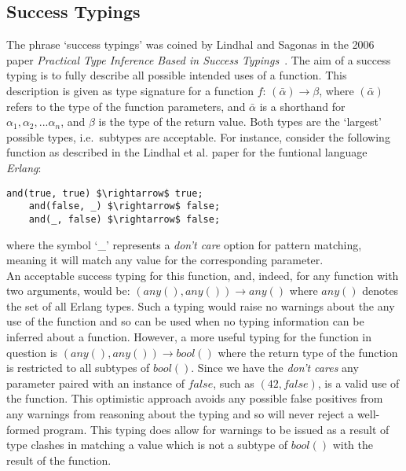 \documentclass[12pt, titlepage]{article}
\begin{document}


\subsection{Success Typings}
The phrase `success typings' was coined by Lindhal and Sagonas in the 2006 paper \textit{Practical Type Inference Based in Success Typings}~\cite{lindhal06}. The aim of a success typing is to fully describe all possible intended uses of a function. This description is given as type signature for a function $f$: $(\bar{\alpha}) \rightarrow \beta$, where $(\bar{\alpha})$ refers to the type of the function parameters, and $\bar{\alpha}$ is a shorthand for $\alpha_1, \alpha_2,...\alpha_n$, and $\beta$ is the type of the return value. Both types are the `largest' possible types, i.e.\ subtypes are acceptable. For instance, consider the following function as described in the Lindhal et al. paper for the funtional language \textit{Erlang}:
\begin{lstlisting}[mathescape]
	and(true, true) $\rightarrow$ true;
	and(false, _) $\rightarrow$ false;
	and(_, false) $\rightarrow$ false;
\end{lstlisting}
where the symbol `\_' represents a \textit{don't care} option for pattern matching, meaning it will match any value for the corresponding parameter. \\
An acceptable success typing for this function, and, indeed, for any function with two arguments, would be: $(any(), any()) \rightarrow any()$ where $any()$ denotes the set of all Erlang types. Such a typing would raise no warnings about the any use of the function and so can be used when no typing information can be inferred about a function. However, a more useful typing for the function in question is $(any(), any()) \rightarrow bool()$ where the return type of the function is restricted to all subtypes of $bool()$. Since we have the \textit{don't cares} any parameter paired with an instance of $false$, such as $(42, false)$, is a valid use of the function. This optimistic approach avoids any possible false positives from any warnings from reasoning about the typing and so will never reject a well-formed program. This typing does allow for warnings to be issued as a result of type clashes in matching a value which is not a subtype of $bool()$ with the result of the function. \\
\end{document}
